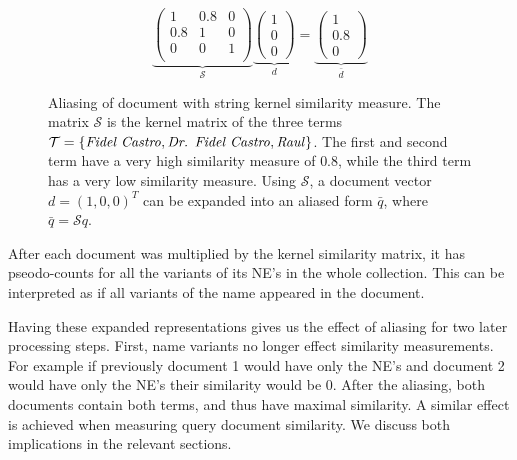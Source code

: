 \begin{figure}[ht]
  \caption{Aliasing of document with string kernel similarity measure.
The matrix $\mathcal{S}$ is the kernel matrix of the three terms $\mathcal{T} = \lbrace
\text{\emph{Fidel Castro}},\text{\emph{Dr. Fidel Castro}}, \text{\emph{Raul}}\rbrace$. The first and second term have a
very high similarity measure of $0.8$, while the third term has a very low similarity measure. Using
$\mathcal{S}$, a document vector $d=(1,0,0)^T$ can be expanded into an aliased form
$\bar q$, where $\bar q = \mathcal{S}q$.}
  \[
     \underbrace{\begin{pmatrix}
      1   & 0.8 & 0\\
      0.8 & 1   & 0\\
      0   & 0   & 1\\
     \end{pmatrix}}_{\mathcal{S}}
     \underbrace{\begin{pmatrix}
     1\\ 0\\0 
     \end{pmatrix}}_{d}
     =
     \underbrace{\begin{pmatrix}
     1\\ 0.8\\0 
     \end{pmatrix}}_{\bar d}
  \]
  \label{eq:example_string_sim}
\end{figure}

After each document was multiplied by the kernel similarity matrix, it has pseodo-counts for all the variants of its NE's in the whole collection. This can be interpreted as if all variants of the name appeared in the document. 

Having these expanded representations gives us the effect of aliasing for two later processing steps. First, name variants no longer effect similarity measurements. For example if previously document 1 would have only the NE's  and document 2 would have only the NE's  their similarity would be 0. After the aliasing, both documents contain both terms, and thus have maximal similarity. A similar effect is achieved when measuring query document similarity. We discuss both implications in the relevant sections.


